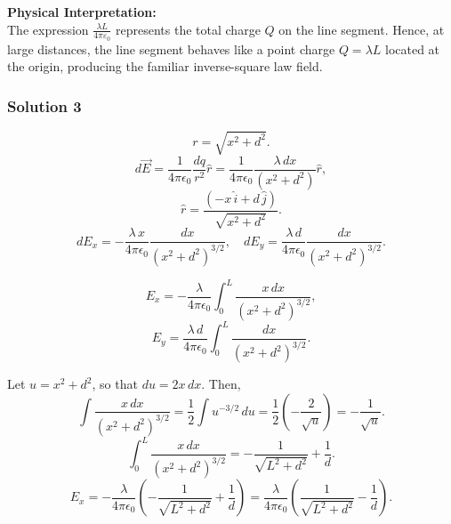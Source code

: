 \documentclass{article}
\begin{document}
\bigskip
\textbf{Physical Interpretation:} \\
The expression \(\frac{\lambda L}{4\pi\varepsilon_0}\) represents the total charge \(Q\) on the line segment. Hence, at large distances, the line segment behaves like a point charge \(Q=\lambda L\) located at the origin, producing the familiar inverse-square law field.


\subsubsection{Solution 3}



\[
r=\sqrt{x^2+d^2}.
\]
\[
d\vec{E}=\frac{1}{4\pi\epsilon_0}\frac{dq}{r^2}\hat{r}=\frac{1}{4\pi\epsilon_0}\frac{\lambda\,dx}{(x^2+d^2)}\hat{r},
\]
\[
\hat{r}=\frac{(-x\,\hat{i}+d\,\hat{j})}{\sqrt{x^2+d^2}}.
\]
\[
dE_x=-\frac{\lambda\,x}{4\pi\epsilon_0}\frac{dx}{(x^2+d^2)^{3/2}},\quad
dE_y=\frac{\lambda\,d}{4\pi\epsilon_0}\frac{dx}{(x^2+d^2)^{3/2}}.
\]


\[
E_x=-\frac{\lambda}{4\pi\epsilon_0}\int_{0}^{L}\frac{x\,dx}{(x^2+d^2)^{3/2}},
\]
\[
E_y=\frac{\lambda\,d}{4\pi\epsilon_0}\int_{0}^{L}\frac{dx}{(x^2+d^2)^{3/2}}.
\]

Let \( u=x^2+d^2 \), so that \( du=2x\,dx \). Then,
\[
\int\frac{x\,dx}{(x^2+d^2)^{3/2}}=\frac{1}{2}\int u^{-3/2}\,du = \frac{1}{2}\left(-\frac{2}{\sqrt{u}}\right)=-\frac{1}{\sqrt{u}}.
\]
\[
\int_{0}^{L}\frac{x\,dx}{(x^2+d^2)^{3/2}} = -\frac{1}{\sqrt{L^2+d^2}} + \frac{1}{d}.
\]
\[
E_x=-\frac{\lambda}{4\pi\epsilon_0}\left(-\frac{1}{\sqrt{L^2+d^2}}+\frac{1}{d}\right)=\frac{\lambda}{4\pi\epsilon_0}\left(\frac{1}{\sqrt{L^2+d^2}}-\frac{1}{d}\right).
\]
\end{document}
